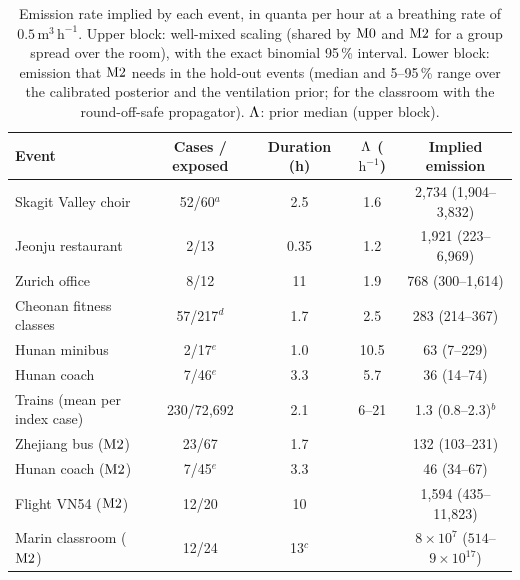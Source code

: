 \begin{table}[tbp]
  \centering\small
  \caption{Emission rate implied by each event, in quanta per hour at a breathing rate of
  $0.5\,\mathrm{m^3\,h^{-1}}$. Upper block: well-mixed scaling (shared by $\mathrm{M0}$ and $\mathrm{M2}$ for a group spread
  over the room), with the exact binomial 95\,\% interval. Lower block: emission that $\mathrm{M2}$ needs in the
  hold-out events (median and 5--95\,\% range over the calibrated posterior and the ventilation prior; for the
  classroom with the round-off-safe propagator).
$\Lambda$: prior median (upper block).}
  \label{s8_outbreaks:tab:levels}
  \setlength{\tabcolsep}{3.8pt}
  \begin{tabular}{@{}lcccc@{}}
    \toprule
    Event & Cases / exposed & Duration (h) & $\Lambda$ ($\mathrm{h^{-1}}$) & Implied emission \\
    \midrule
    Skagit Valley choir \citep{hamner2020}  & 52/60$^{a}$ & 2.5  & 1.6  & 2{,}734 (1{,}904--3{,}832) \\
    Jeonju restaurant \citep{kwon2020}      & 2/13        & 0.35 & 1.2  & 1{,}921 (223--6{,}969) \\
    Zurich office \citep{weissberg2020}     & 8/12        & 11   & 1.9  & 768 (300--1{,}614) \\
    Cheonan fitness classes \citep{jang2020}& 57/217$^{d}$ & 1.7 & 2.5  & 283 (214--367) \\
    Hunan minibus \citep{ou2022}            & 2/17$^{e}$  & 1.0  & 10.5 & 63 (7--229) \\
    Hunan coach \citep{ou2022}              & 7/46$^{e}$  & 3.3  & 5.7  & 36 (14--74) \\
    Trains (mean per index case)            & 230/72{,}692 & 2.1 & 6--21 & 1.3 (0.8--2.3)$^{b}$ \\
    \midrule
    Zhejiang bus ($\mathrm{M2}$)                    & 23/67       & 1.7  &      & 132 (103--231) \\
    Hunan coach ($\mathrm{M2}$)                     & 7/45$^{e}$  & 3.3  &      & 46 (34--67) \\
    Flight VN54 ($\mathrm{M2}$)                     & 12/20       & 10   &      & 1{,}594 (435--11{,}823) \\
    Marin classroom ($\mathrm{M2}$)                 & 12/24       & 13$^{c}$ &  & $8\times10^{7}$ ($514$--$9\times10^{17}$) \\
    \bottomrule
  \end{tabular}


\end{table}
